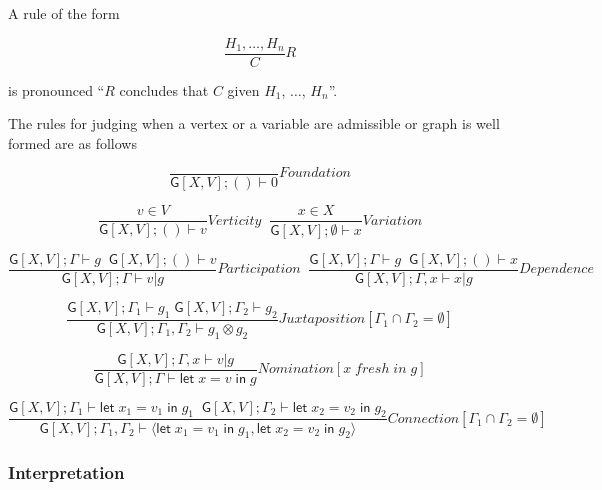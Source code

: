 \documentclass[12pt]{llncs}
\begin{document}
A rule of the form

\[\frac{ H_1, \ldots , H_n }{ C }R\]

is pronounced ``\(R\) concludes that \(C\) given \(H_1\), \(\ldots\),
\(H_n\)''.

The rules for judging when a vertex or a variable are admissible or
graph is well formed are as follows

\[\frac{ }{ \mathsf{G}[X,V]; () \vdash 0}Foundation\]

\[\frac{ v \in V }{ \mathsf{G}[X,V]; () \vdash v}Verticity \;\;\frac{ x \in X }{ \mathsf{G}[X,V]; \emptyset \vdash x}Variation\]

\[\frac{ \mathsf{G}[X,V]; \Gamma \vdash g \;\; \mathsf{G}[X,V]; () \vdash v }{ \mathsf{G}[X,V]; \Gamma \vdash v | g}Participation \; \; \frac{ \mathsf{G}[X,V]; \Gamma \vdash g \;\; \mathsf{G}[X,V]; () \vdash x }{ \mathsf{G}[X,V]; \Gamma, x \vdash x | g}Dependence\]

\[\frac{ \mathsf{G}[X,V]; \Gamma_1 \vdash g_1 \; \mathsf{G}[X,V]; \Gamma_2 \vdash g_2}{ \mathsf{G}[X,V]; \Gamma_1, \Gamma_2 \vdash g_1 \otimes g_2}Juxtaposition[\Gamma_1 \cap \Gamma_2 = \emptyset]\]

\[\frac{ \mathsf{G}[X,V]; \Gamma,x \vdash v|g}{ \mathsf{G}[X,V]; \Gamma \vdash \mathsf{let}\; x = v \; \mathsf{in}\; g}Nomination[x \;fresh\; in\; g]\]

\[\frac{ \mathsf{G}[X,V]; \Gamma_1 \vdash \mathsf{let}\; x_1 = v_1 \; \mathsf{in}\; g_1 \; \;\mathsf{G}[X,V]; \Gamma_2 \vdash \mathsf{let}\; x_2 = v_2 \; \mathsf{in}\; g_2}{ \mathsf{G}[X,V]; \Gamma_1,\Gamma_2 \vdash \langle \mathsf{let}\; x_1 = v_1 \; \mathsf{in}\; g_1, \mathsf{let}\; x_2 = v_2 \; \mathsf{in}\; g_2 \rangle}Connection[\Gamma_1 \cap \Gamma_2 = \emptyset]\]

\hypertarget{interpretation}{%
\subsubsection{Interpretation}\label{interpretation}}
\end{document}
